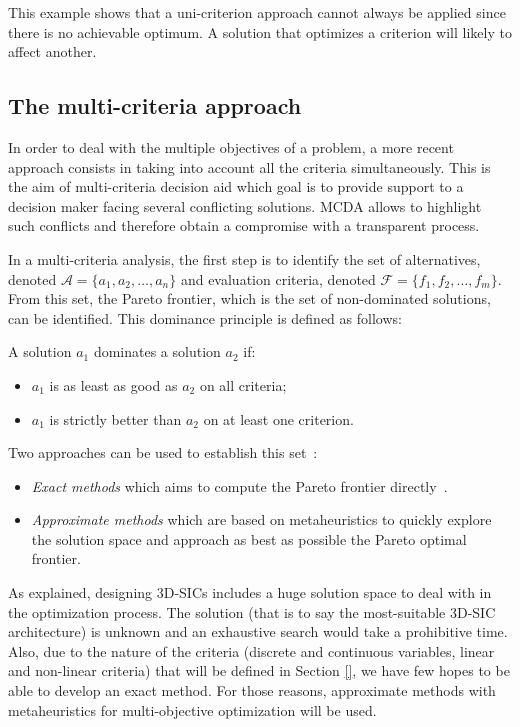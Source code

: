 This example shows that a uni-criterion approach cannot always be applied since there is no achievable optimum. A solution that optimizes a criterion will likely to affect another.

\subsection{The multi-criteria approach}
\label{subsex:rol.multicrit_approach}

In order to deal with the multiple objectives of a problem, a more recent approach consists in taking into account all the criteria simultaneously. This is the aim of multi-criteria decision aid which goal is to provide support to a decision maker facing several conflicting solutions. MCDA allows to highlight such conflicts and therefore obtain a compromise with a transparent process.


In a multi-criteria analysis, the first step is to identify the set of alternatives, denoted $\mathcal{A}=\{a_1, a_2, \ldots, a_n\}$ and evaluation criteria, denoted $\mathcal{F}=\{f_1,f_2,\ldots, f_m\}$. From this set, the Pareto frontier, which is the set of non-dominated solutions, can be identified. This dominance principle is defined as follows:

\begin{definition}[Dominance]
A solution $a_1$ dominates a solution $a_2$ if:
\begin{itemize}
\item $a_1$ is as least as good as $a_2$ on all criteria;
\item $a_1$ is strictly better than $a_2$ on at least one criterion.
\end{itemize}
\end{definition}

Two approaches can be used to establish this set~\cite{Vin92}:
\begin{itemize}
\item \textit{Exact methods} which aims to compute the Pareto frontier directly~\cite{EhrgottGandibleuxbook02,steuer86a}.
\item \textit{Approximate methods} which are based on metaheuristics to quickly explore the solution space and approach as best as possible the Pareto optimal frontier\cite{talbi09}.
\end{itemize}
As explained, designing 3D-SICs includes a huge solution space to deal with in the optimization process. The solution (that is to say the most-suitable 3D-SIC architecture) is unknown and an exhaustive search would take a prohibitive time. Also, due to the nature of the criteria (discrete and continuous variables, linear and non-linear criteria) that will be defined in Section \ref{}, we have few hopes to be able to develop an exact method. For those reasons, approximate methods with metaheuristics for multi-objective optimization will be used.

